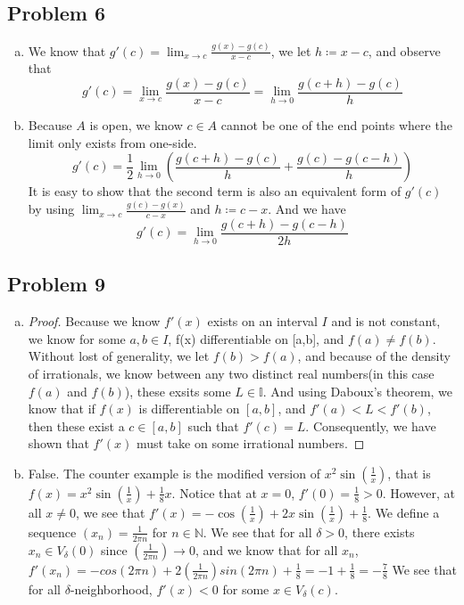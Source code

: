 \documentclass[12pt]{article}
\begin{document}
\subsection*{Problem 6}
\begin{enumerate}[a).]
    \item {
        We know that $g'(c) = \lim_{x \rightarrow c} \frac{g(x) - g(c)}{x - c}$, we let $h \coloneq x - c$, and observe that 
        $$g'(c) = \lim_{x \rightarrow c} \frac{g(x) - g(c)}{x - c} = \lim_{h \rightarrow 0} \frac{g(c+h) - g(c)}{h}$$
    }
    \item {
        Because $A$ is open, we know $c \in A$ cannot be one of the end points where the limit only exists from one-side. 
        $$g'(c) = \frac{1}{2} \lim_{h \rightarrow 0} (\frac{g(c+h) - g(c)}{h}+\frac{g(c) - g(c-h)}{h})$$
        It is easy to show that the second term is also an equivalent form of $g'(c)$ by using $\lim_{x\rightarrow c}\frac{g(c) - g(x)}{c-x}$ and $h \coloneq c-x$. 
        And we have
        $$g'(c) = \lim_{h \rightarrow 0} \frac{g(c+h) - g(c-h)}{2h}$$

    }
\end{enumerate}
\subsection*{Problem 9}
\begin{enumerate}[a).]
    \item {
        \begin{proof}
        Because we know $f'(x)$ exists on an interval $I$ and is not constant, we know for some $a, b \in I$, f(x) differentiable on [a,b], and $f(a) \ne f(b)$. 
        Without lost of generality, we let $f(b) > f(a)$, and because of the density of irrationals, we know between any two distinct real numbers(in this case $f(a)$ and $f(b)$), these exsits some $L \in \mathbb{I}$. 
        And using Daboux's theorem, we know that if $f(x)$ is differentiable on $[a,b]$, and $f'(a) < L < f'(b)$, then these exist a $c \in [a,b]$ such that $f'(c) = L$.
        Consequently, we have shown that $f'(x)$ must take on some irrational numbers. 
        \end{proof}
    }
    \item {
        False. 
        The counter example is the modified version of $x^2\sin(\frac{1}{x})$, that is $f(x) = x^2\sin(\frac{1}{x}) + \frac{1}{8}x$. 
        Notice that at $x = 0$, $f'(0) = \frac{1}{8} > 0$. 
        However, at all $x \ne 0$, we see that $f'(x) = -\cos(\frac{1}{x}) + 2x\sin(\frac{1}{x}) + \frac{1}{8}$. 
        We define a sequence $(x_n) = \frac{1}{2\pi n}$ for $n \in \mathbb{N}$.
        We see that for all $\delta > 0$, there exists $x_n \in V_{\delta}(0)$ since $(\frac{1}{2\pi n}) \rightarrow 0$, and we know that for all $x_n$, $f'(x_n) = -cos(2 \pi n) + 2(\frac{1}{2 \pi n})sin(2\pi n) + \frac{1}{8} = -1 + \frac{1}{8} = -\frac{7}{8}$
        We see that for all $\delta$-neighborhood, $f'(x) < 0$ for some $x \in V_{\delta}(c)$. 
    }
\end{enumerate}
\end{document}
